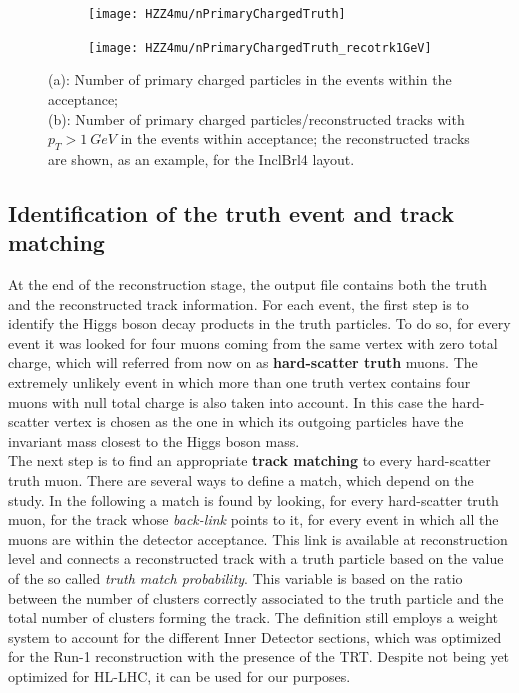 \documentclass[a4paper,twoside,12pt]{book}
\begin{document}
\begin{figure}
\begin{subfigure}{.5\linewidth}
\texttt{[image: HZZ4mu/nPrimaryChargedTruth]}
\caption{ }
\label{fig:HZZ4mu:nPrimaryChargedTruth}
\end{subfigure}
\begin{subfigure}{.5\linewidth}
\texttt{[image: HZZ4mu/nPrimaryChargedTruth\_recotrk1GeV]}
\caption{ }
\label{fig:HZZ4mu:nPrimaryChargedTruth_recotrk1GeV}
\end{subfigure}
\caption{(a): Number of primary charged particles in the events within the acceptance;\\
                  (b): Number of primary charged particles/reconstructed tracks with $p_{T} > 1\ GeV$ in the events within acceptance; the reconstructed tracks are shown, as an example, for the InclBrl4 layout.}
\label{fig:HZZ4mu:nTracks}
\end{figure}

\subsection*{Identification of the truth event and track matching}
At the end of the reconstruction stage, the output file contains both the truth and the reconstructed track information. For
each event, the first step is to identify the Higgs boson decay products in the truth particles.
To do so, for every event it was looked for four muons coming from the same vertex with zero total charge, which
will referred from now on as \textbf{hard-scatter truth} muons. The extremely unlikely event in which more
than one truth vertex contains four muons with null total charge is also taken into account. In this case 
the hard-scatter vertex is chosen as the one in which its outgoing particles have the invariant mass closest to the Higgs boson mass.\\

The next step is to find an appropriate \textbf{track matching} to every hard-scatter truth muon. There
are several ways to define a match, which depend on the study. In the following a match is found by looking,
for every hard-scatter truth muon, for the track whose \textit{back-link} points to it, for every event in which all the muons are within
the detector acceptance. This link is available at reconstruction
level and connects a reconstructed track with a truth particle based on the value of the so called \textit{truth match probability}.
This variable is based on the ratio between the number of clusters correctly associated to the truth particle and the total number
of clusters forming the track. The definition still employs a weight system to account for the different Inner Detector sections,
which was optimized for the Run-1 reconstruction with the presence of the TRT. Despite not being yet optimized for HL-LHC, it
can be used for our purposes.
\end{document}
